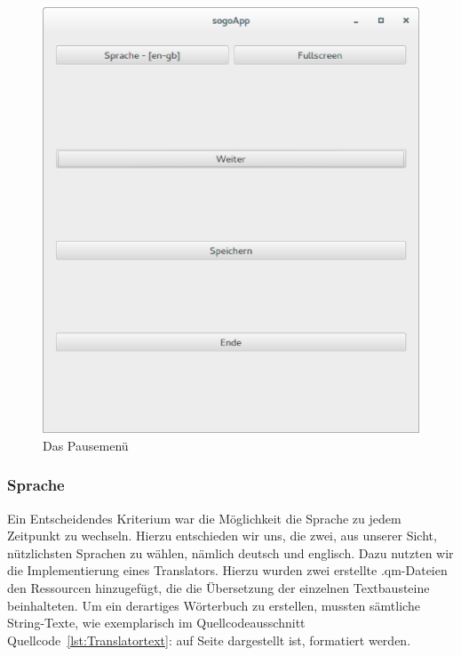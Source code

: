 \documentclass[a4paper]{scrartcl}
\begin{document}
\begin{figure}[H]
 \centering
 \includegraphics[scale=0.35]{graphics/pausemenu.eps}
 \caption{Das Pausemenü}
 \label{fig:Pausemenü}
\end{figure}

\subsubsection{Sprache}\label{ch:Sprache}
Ein Entscheidendes Kriterium war die Möglichkeit die Sprache zu jedem Zeitpunkt zu wechseln. Hierzu entschieden wir uns, die zwei, aus unserer Sicht, nützlichsten Sprachen zu wählen, nämlich deutsch und englisch. Dazu nutzten wir die Implementierung eines Translators. Hierzu wurden zwei erstellte .qm-Dateien den Ressourcen hinzugefügt, die die Übersetzung der einzelnen Textbausteine beinhalteten. Um ein derartiges Wörterbuch zu erstellen, mussten sämtliche String-Texte, wie exemplarisch im Quellcodeausschnitt Quellcode~\ref{lst:Translatortext}: auf Seite \pageref{lst:Translatortext} dargestellt ist, formatiert werden. 
\end{document}
